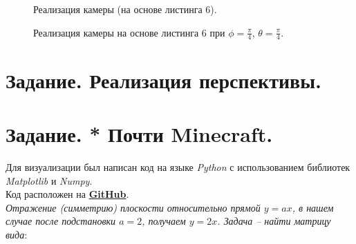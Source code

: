 \documentclass[a5paper, 10pt]{article}
\theoremstyle{definition}
\theoremstyle{plain}
\theoremstyle{remark}
\begin{document}
\begin{figure}[h!]
\caption{Реализация камеры (на основе листинга 6).}
\end{figure}

\begin{figure}[h!]
\caption{Реализация камеры на основе листинга 6 при $\phi = \frac{\pi}{4}$, $\theta = \frac{\pi}{4}$.}
\end{figure}

\newpage
\section{Задание. Реализация перспективы.}



\newpage
\section{Задание. * Почти Minecraft.}



Для визуализации был написан код на языке \textit{Python} с использованием библиотек \textit{Matplotlib} и \textit{Numpy}. \\
Код расположен на \href{https://github.com/a-nechaeva/practical_Linal/tree/main/lab2/py_code}{\textbf{GitHub}}.
\\
\textit{Отражение (симметрию) плоскости относительно прямой $y=ax$, в нашем случае после подстановки $a=2$, получаем $y=2x$. Задача -- найти матрицу вида}:
\end{document}
